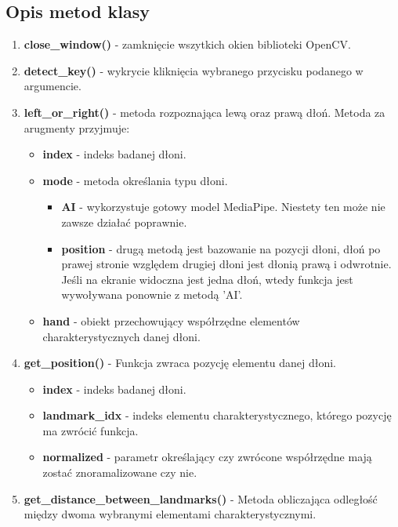 \subsection{Opis metod klasy}

\begin{enumerate}
    \item \textbf{close\_window()} - zamknięcie wszytkich okien biblioteki OpenCV.
    \item \textbf{detect\_key()} - wykrycie kliknięcia wybranego przycisku podanego w argumencie.
    \item \textbf{left\_or\_right()} - metoda rozpoznająca lewą oraz prawą dłoń. Metoda za arugmenty przyjmuje:
    \begin{itemize}
        \item \textbf{index} - indeks badanej dłoni. 
        \item \textbf{mode} - metoda określania typu dłoni. 
        \begin{itemize}
            \item \textbf{AI} - wykorzystuje gotowy model MediaPipe. Niestety ten może nie zawsze działać poprawnie. 
            \item \textbf{position} - drugą metodą jest bazowanie na pozycji dłoni, dłoń po prawej stronie względem drugiej dłoni jest dłonią prawą i odwrotnie. Jeśli na ekranie widoczna jest jedna dłoń, wtedy funkcja jest wywoływana ponownie z metodą 'AI'.
        \end{itemize}
        \item \textbf{hand} - obiekt przechowujący współrzędne elementów charakterystycznych danej dłoni. 
    \end{itemize}
    \item \textbf{get\_position()} - Funkcja zwraca pozycję elementu danej dłoni. 
    \begin{itemize}
        \item \textbf{index} - indeks badanej dłoni. 
        \item \textbf{landmark\_idx} - indeks elementu charakterystycznego, którego pozycję ma zwrócić funkcja. 
        \item \textbf{normalized} - parametr określający czy zwrócone współrzędne mają zostać znoramalizowane czy nie. 
    \end{itemize}
    \item \textbf{get\_distance\_between\_landmarks()} - Metoda obliczająca odległość między dwoma wybranymi elementami charakterystycznymi.
    \begin{itemize}

\end{itemize}
\end{enumerate}

